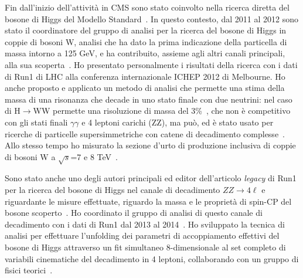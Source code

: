 \documentclass[11pt,twoside,a4paper]{article}
\begin{document}
Fin dall'inizio dell'attivit\`a in CMS sono stato coinvolto nella
ricerca diretta del bosone di Higgs del Modello
Standard~\cite{Chatrchyan:2011tz,Chatrchyan:2012tx,Chatrchyan:2012ty}. In
questo contesto, dal 2011 al 2012 sono stato il coordinatore del
gruppo di analisi per la ricerca del bosone di Higgs in coppie di
bosoni W, analisi che ha dato la prima indicazione della particella di
massa intorno a 125 GeV, e ha contribuito, assieme agli altri canali
principali, alla sua
scoperta~\cite{Chatrchyan:2012ufa,Chatrchyan:2013lba}. Ho presentato
personalmente i risultati della ricerca con i dati di Run1 di LHC alla
conferenza internazionale ICHEP 2012 di Melbourne. Ho anche proposto e
applicato un metodo di analisi che permette una stima della massa di
una risonanza che decade in uno stato finale con due neutrini: nel
caso di H$\to$WW permette una risoluzione di massa del
3\%~\cite{Chatrchyan:2013iaa}, che non \`e competitivo con gli stati
finali $\gamma\gamma$ e 4 leptoni carichi (ZZ), ma pu\`o, ed \`e stato
usato per ricerche di particelle supersimmetriche con catene di
decadimento complesse~\cite{Khachatryan:2016epu}. Allo stesso tempo ho
misurato la sezione d'urto di produzione inclusiva di coppie di bosoni
W a $\sqrt{s}$=7 e 8 TeV~\cite{Chatrchyan:2013yaa}.

Sono stato anche uno degli autori principali ed editor dell'articolo
\textit{legacy} di Run1 per la ricerca del bosone di Higgs nel canale
di decadimento $ZZ\to4\ell$ e riguardante le misure effettuate,
riguardo la massa e le propriet\`a di spin-CP del bosone
scoperto~\cite{Chatrchyan:2013mxa}. Ho coordinato il gruppo di analisi
di questo canale di decadimento con i dati di Run1 dal 2013 al
2014~\cite{Khachatryan:2014kca}. Ho sviluppato la tecnica di analisi
per effettuare l'unfolding dei parametri di accoppiamento effettivi
del bosone di Higgs attraverso un fit simultaneo 8-dimensionale al set
completo di variabili cinematiche del decadimento in 4 leptoni,
collaborando con un gruppo di fisici teorici~\cite{Chen:2014pia}.
\end{document}
